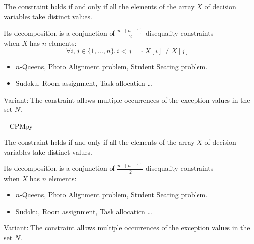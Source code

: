\documentclass{cons-beamer}
\begin{document}
\subsection{}

\begin{frame}{}
  \begin{definition}
    The  constraint holds if and only if all the elements of the array $X$ of decision variables take distinct values.
  \end{definition}
  
  Its decomposition is a conjunction of \(\frac{n \cdot (n-1)}{2}\) disequality constraints \\
  when \( X \) has \( n \) elements:
  \[
  \forall i, j \in \{1, \ldots, n\}, i < j \implies X[i] \neq X[j]
  \]
  \vfill

  \begin{examples}
    \begin{itemize}
      \item $n$-Queens, Photo Alignment problem, Student Seating problem.
      \item Sudoku, Room assignment, Task allocation \dots
    \end{itemize}
  \end{examples}
  \vfill

  Variant: The  constraint allows multiple occurrences of the exception values in the set \( N \).
\end{frame}

\begin{flashcardcpmpy}
\begin{frame}{ -- CPMpy}
  \begin{definition}
    The  constraint holds if and only if all the elements of the array $X$ of decision variables take distinct values.
  \end{definition}
  Its decomposition is a conjunction of \(\frac{n \cdot (n-1)}{2}\) disequality constraints \\
  when \( X \) has \( n \) elements:
  \begin{center}
    \cpminline{[var1 != var2 for var1, var2 in all_pairs(X)]}
  \end{center}
  \vfill
  
  \begin{examples}
    \begin{itemize}
      \item $n$-Queens, Photo Alignment problem, Student Seating problem.
      \item Sudoku, Room assignment, Task allocation \dots
    \end{itemize}
  \end{examples}
  \vfill

  Variant: The  constraint allows multiple occurrences of the exception values in the set \( N \).
\end{frame}
\end{flashcardcpmpy}
\end{document}
